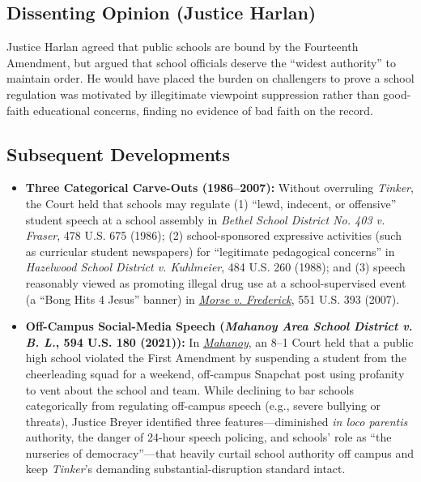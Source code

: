 \documentclass[12pt]{article}
\begin{document}
\subsection{Dissenting Opinion (Justice Harlan)}

Justice Harlan agreed that public schools are bound by the Fourteenth Amendment, but argued that school officials deserve the ``widest authority'' to maintain order. He would have placed the burden on challengers to prove a school regulation was motivated by illegitimate viewpoint suppression rather than good-faith educational concerns, finding no evidence of bad faith on the record.

\subsection{Subsequent Developments}

\begin{itemize}

\item \textbf{Three Categorical Carve-Outs (1986--2007):} Without overruling \textit{Tinker}, the Court held that schools may regulate (1) ``lewd, indecent, or offensive'' student speech at a school assembly in \textit{Bethel School District No. 403 v. Fraser}, 478 U.S. 675 (1986); (2) school-sponsored expressive activities (such as curricular student newspapers) for ``legitimate pedagogical concerns'' in \textit{Hazelwood School District v. Kuhlmeier}, 484 U.S. 260 (1988); and (3) speech reasonably viewed as promoting illegal drug use at a school-supervised event (a ``Bong Hits 4 Jesus'' banner) in \href{https://supreme.justia.com/cases/federal/us/551/393/}{\textit{Morse v. Frederick}}, 551 U.S. 393 (2007).
  \item \textbf{Off-Campus Social-Media Speech (\textit{Mahanoy Area School District v. B. L.}, 594 U.S. 180 (2021)):} In \href{https://supreme.justia.com/cases/federal/us/594/20-255/}{\textit{Mahanoy}}, an 8--1 Court held that a public high school violated the First Amendment by suspending a student from the cheerleading squad for a weekend, off-campus Snapchat post using profanity to vent about the school and team. While declining to bar schools categorically from regulating off-campus speech (e.g., severe bullying or threats), Justice Breyer identified three features---diminished \textit{in loco parentis} authority, the danger of 24-hour speech policing, and schools' role as ``the nurseries of democracy''---that heavily curtail school authority off campus and keep \textit{Tinker}'s demanding substantial-disruption standard intact.

\end{itemize}
\end{document}
